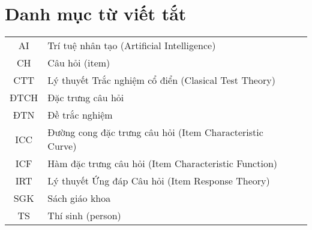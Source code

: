 \chapter*{Danh mục từ viết tắt}
\begin{longtable}{SlSl}
	AI & Trí tuệ nhân tạo (Artificial Intelligence)\\
	CH & Câu hỏi (item)\\
	CTT & Lý thuyết Trắc nghiệm cổ điển (Clasical Test Theory)\\
	ĐTCH & Đặc trưng câu hỏi\\
	ĐTN & Đề trắc nghiệm\\
	ICC & Đường cong đặc trưng câu hỏi (Item Characteristic Curve)\\
	ICF & Hàm đặc trưng câu hỏi (Item Characteristic Function)\\
	IRT & Lý thuyết Ứng đáp Câu hỏi (Item Response Theory)\\
	SGK & Sách giáo khoa\\
	TS & Thí sinh (person)\\
\end{longtable}

